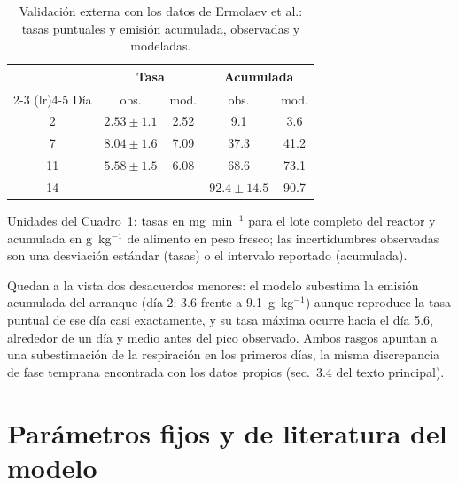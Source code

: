 \documentclass[11pt,a4paper]{article}
\begin{document}
\begin{table}[htbp]
\centering
\small
\caption{Validación externa con los datos de Ermolaev et al.: tasas puntuales y emisión acumulada, observadas y modeladas.}
\label{cua:ermolaev}
\begin{tabular}{c cc cc}
\toprule
& \multicolumn{2}{c}{Tasa} & \multicolumn{2}{c}{Acumulada} \\
\cmidrule(lr){2-3} \cmidrule(lr){4-5}
Día & obs. & mod. & obs. & mod. \\
\midrule
2  & $2.53 \pm 1.1$ & 2.52 & 9.1  & 3.6 \\
7  & $8.04 \pm 1.6$ & 7.09 & 37.3 & 41.2 \\
11 & $5.58 \pm 1.5$ & 6.08 & 68.6 & 73.1 \\
14 & --- & --- & $92.4 \pm 14.5$ & 90.7 \\
\bottomrule
\end{tabular}
\end{table}

\noindent Unidades del Cuadro~\ref{cua:ermolaev}: tasas en mg~min$^{-1}$ para el lote completo del reactor y acumulada en g~kg$^{-1}$ de alimento en peso fresco; las incertidumbres observadas son una desviación estándar (tasas) o el intervalo reportado (acumulada).

Quedan a la vista dos desacuerdos menores: el modelo subestima la emisión acumulada del arranque (día 2: 3.6 frente a 9.1~g~kg$^{-1}$) aunque reproduce la tasa puntual de ese día casi exactamente, y su tasa máxima ocurre hacia el día 5.6, alrededor de un día y medio antes del pico observado. Ambos rasgos apuntan a una subestimación de la respiración en los primeros días, la misma discrepancia de fase temprana encontrada con los datos propios (sec.~3.4 del texto principal).

\section{Parámetros fijos y de literatura del modelo}
\label{sec:paramfijos}
\end{document}
